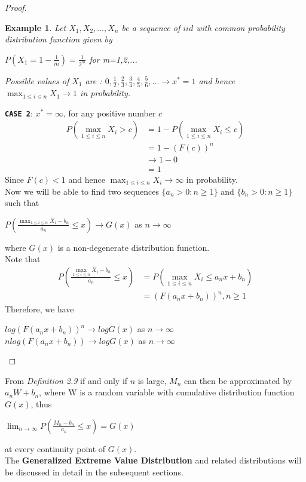 \documentclass[11pt,a4paper]{article}
\theoremstyle{plain}
\newtheorem{exmp}[fact]{Example}
\begin{document}
\begin{proof}
\begin{exmp}
Let $X_1,X_2,...,X_n$ be a sequence of $iid$ with common probability distribution function given by\\
\begin{center}
$P(X_1=1-\frac{1}{m})=\frac{1}{2^m}$ for m=1,2,...
\end{center}
Possible values of $X_1$ are : $0,\frac{1}{2}, \frac{2}{3},\frac{3}{4},\frac{4}{5},\frac{5}{6},... \rightarrow x^*=1$ and hence $\max_{1 \leq i \leq n}X_1 \rightarrow 1$ in probability.
\end{exmp}
\textbf{\texttt{CASE 2}}: $x^* = \infty$, for any positive number $c$ \\
\begin{equation*}
\begin{split}
P(\max_{1 \leq i \leq n }X_i > c) & = 1- P(\max_{1 \leq i \leq n }X_i \leq c)\\
                & = 1-(F(c))^n\\
                & \rightarrow 1-0\\
                &= 1
\end{split}
\end{equation*}  
Since $F(c)<1$ and hence $\max_{1 \leq i \leq n }X_i \rightarrow \infty$ in probability.\\
Now we will be able to find two sequences $\{a_n>0 : n \geq 1\}$ and $\{b_n>0 : n \geq 1\}$ such that
\begin{center}
$P(\frac{\max_{1 \leq i \leq n }X_i-b_n}{a_n}\leq x)\rightarrow G(x)$ as $n \rightarrow \infty$
\end{center}
where $G(x)$ is a non-degenerate distribution function.\\
Note that
\begin{equation*}
\begin{split}
P(\frac{\max_{1 \leq i \leq n }X_i-b_n}{a_n}\leq x) & = P(\max_{1 \leq i \leq n} X_i \leq a_nx+b_n)\\
& = (F(a_nx+b_n))^n, n\geq 1
\end{split}
\end{equation*}
Therefore, we have
\begin{center}
$log(F(a_nx+b_n))^n \rightarrow logG(x)$ as $n \rightarrow \infty$\\
$nlog(F(a_nx+b_n)) \rightarrow logG(x)$ as $n \rightarrow \infty$
\end{center}

\end{proof}
From \emph{Definition 2.9} if and only if $n$ is large, $M_n$ can then be approximated by $a_nW+b_n$, where W is a random variable with cumulative distribution function $G(x)$, thus 
\begin{center}
$\lim_{n\rightarrow \infty}P(\frac{M_n-b_n}{a_n}\leq x)=G(x)$
\end{center}
at every continuity point of $G(x)$.\\
The \textbf{Generalized Extreme Value Distribution} and related distributions will be discussed in detail in the subsequent sections.
\end{document}

